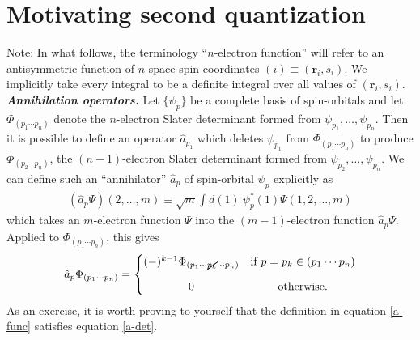 \documentclass[11pt,fleqn]{article}
\newcommand{\F}{\Phi}        %
\newcommand{\y}{\psi}        %
\newcommand{\Y}{\Psi}        %
\newcommand{\op}[1]{\ensuremath{\hat{#1}}}
\newcommand{\ld}{\ensuremath{\ldots}}
\newcommand{\cd}{\ensuremath{\cdots}}
\newcommand{\bmit}[1]{{\bfseries\itshape\mathversion{bold}#1}}
\newcommand{\bo}[1]{\ensuremath{\mathbf{#1}}}
\newcommand{\ar}[1]{\ensuremath{\begin{matrix}#1\end{matrix}}}
\theoremstyle{mystyle}
\begin{document}
\section*{Motivating second quantization}

{\small Note: In what follows, the terminology ``$n$-electron function'' will refer to an \underline{antisymmetric} function of $n$ space-spin coordinates $(i)\equiv(\bo{r}_i,s_i)$.  We implicitly take every integral to be a definite integral over all values of $(\bo{r}_i,s_i)$.}\\


\noindent
\bmit{Annihilation operators.}
Let $\{\y_p\}$ be a complete basis of spin-orbitals and let $\F_{(p_1\cd p_n)}$ denote the $n$-electron Slater determinant formed from $\y_{p_1},\ld,\y_{p_n}$.
Then it is possible to define an operator $\op{a}_{p_1}$ which deletes $\y_{p_1}$ from $\F_{(p_1\cd p_n)}$ to produce $\F_{(p_2\cd p_n)}$, the $(n-1)$-electron Slater determinant formed from $\y_{p_2},\ld,\y_{p_n}$.
We can define such an ``annihilator'' $\op{a}_p$ of spin-orbital $\y_p$ explicitly as
\begin{align}
\label{a-func}
  (\op{a}_p\Y)(2,\ld,m)
\equiv
  \sqrt{m}
  \int d(1)\
  \y_p^*(1)\Y(1,2,\ld,m)
\end{align}
which takes an $m$-electron function $\Y$ into the $(m-1)$-electron function $\op{a}_p\Y$.
Applied to $\F_{(p_1\cd p_n)}$, this gives
\begin{align}
\label{a-det}
  \op{a}_p\F_{(p_1\cd p_n)}
=
  \left\{\ar{
    (-)^{k-1}\F_{(p_1\cd \cancel{p_k}\cd p_n)} & \text{if $p=p_k\in (p_1\cd p_n)$}\\[10pt]
    0 & \text{otherwise.}
  }\right.
\end{align}
As an exercise, it is worth proving to yourself that the definition in equation \ref{a-func} satisfies equation \ref{a-det}.\\
\end{document}
